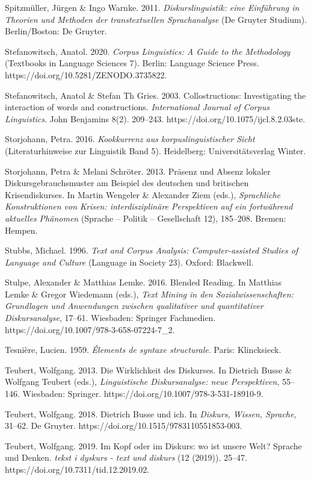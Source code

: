 Spitzmüller, Jürgen \& Ingo Warnke. 2011. \emph{Diskurslinguistik: eine Einführung in Theorien und Methoden der transtextuellen Sprachanalyse} (De Gruyter Studium). Berlin/Boston: De Gruyter.

Stefanowitsch, Anatol. 2020. \emph{Corpus Linguistics: A Guide to the Methodology} (Textbooks in Language Sciences 7). Berlin: Language Science Press. https://doi.org/10.5281/ZENODO.3735822.

Stefanowitsch, Anatol \& Stefan Th Gries. 2003. Collostructions: Investigating the interaction of words and constructions. \emph{International Journal of Corpus Linguistics}. John Benjamins 8(2). 209--243. https://doi.org/10.1075/ijcl.8.2.03ste.

Storjohann, Petra. 2016. \emph{Kookkurrenz aus korpuslinguistischer Sicht} (Literaturhinweise zur Linguistik Band 5). Heidelberg: Universitätsverlag Winter.

Storjohann, Petra \& Melani Schröter. 2013. Präsenz und Absenz lokaler Diskursgebrauchsmuster am Beispiel des deutschen und britischen Krisendiskurses. In Martin Wengeler \& Alexander Ziem (eds.), \emph{Sprachliche Konstruktionen von Krisen: interdisziplinäre Perspektiven auf ein fortwährend aktuelles Phänomen} (Sprache -- Politik -- Gesellschaft 12), 185--208. Bremen: Hempen.

Stubbs, Michael. 1996. \emph{Text and Corpus Analysis: Computer-assisted Studies of Language and Culture} (Language in Society 23). Oxford: Blackwell.

Stulpe, Alexander \& Matthias Lemke. 2016. Blended Reading. In Matthias Lemke \& Gregor Wiedemann (eds.), \emph{Text Mining in den Sozialwissenschaften: Grundlagen und Anwendungen zwischen qualitativer und quantitativer Diskursanalyse}, 17--61. Wiesbaden: Springer Fachmedien. https://doi.org/10.1007/978-3-658-07224-7\_2.

Tesnière, Lucien. 1959. \emph{Élements de syntaxe structurale}. Paris: Klincksieck.

Teubert, Wolfgang. 2013. Die Wirklichkeit des Diskurses. In Dietrich Busse \& Wolfgang Teubert (eds.), \emph{Linguistische Diskursanalyse: neue Perspektiven}, 55--146. Wiesbaden: Springer. https://doi.org/10.1007/978-3-531-18910-9.

Teubert, Wolfgang. 2018. Dietrich Busse und ich. In \emph{Diskurs, Wissen, Sprache}, 31--62. De Gruyter. https://doi.org/10.1515/9783110551853-003.

Teubert, Wolfgang. 2019. Im Kopf oder im Diskurs: wo ist unsere Welt? Sprache und Denken. \emph{tekst i dyskurs - text und diskurs} (12 (2019)). 25--47. https://doi.org/10.7311/tid.12.2019.02.

